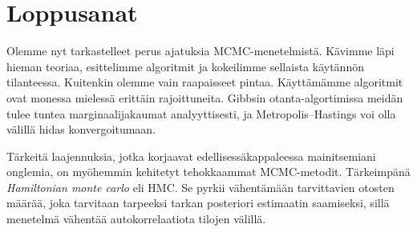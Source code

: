 \chapter{Loppusanat}

Olemme nyt tarkastelleet perus ajatuksia MCMC-menetelmistä. Kävimme läpi hieman teoriaa, esittelimme algoritmit ja kokeilimme sellaista käytännön tilanteessa. Kuitenkin olemme vain raapaisseet pintaa. Käyttämämme algoritmit ovat monessa mielessä erittäin rajoittuneita. Gibbsin otanta-algortimissa meidän tulee tuntea marginaalijakaumat analyyttisesti, ja Metropolis--Hastings voi olla välillä hidas konvergoitumaan. 

Tärkeitä laajennuksia, jotka korjaavat edellisessäkappaleessa mainitsemiani onglemia, on myöhemmin kehitetyt tehokkaammat MCMC-metodit. Tärkeimpänä \textit{Hamiltonian monte carlo} eli HMC. Se pyrkii vähentämään tarvittavien otosten määrää, joka tarvitaan tarpeeksi tarkan posteriori estimaatin saamiseksi, sillä menetelmä vähentää autokorrelaatiota tilojen välillä.

